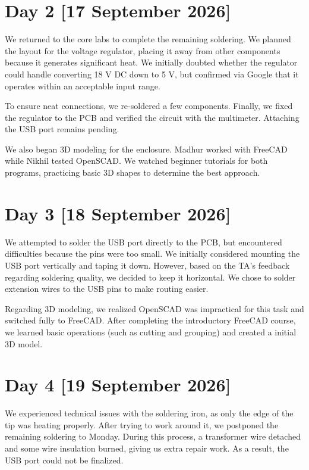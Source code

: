 \documentclass{article}
\begin{document}
\section{Day 2 [17 September 2026]}
We returned to the core labs to complete the remaining soldering. We planned the layout for the voltage regulator, placing it away from other components because it generates significant heat. We initially doubted whether the regulator could handle converting 18 V DC down to 5 V, but confirmed via Google that it operates within an acceptable input range.

To ensure neat connections, we re-soldered a few components. Finally, we fixed the regulator to the PCB and verified the circuit with the multimeter. Attaching the USB port remains pending.

We also began 3D modeling for the enclosure. Madhur worked with FreeCAD while Nikhil tested OpenSCAD. We watched beginner tutorials for both programs, practicing basic 3D shapes to determine the best approach.






\section{Day 3 [18 September 2026]}
We attempted to solder the USB port directly to the PCB, but encountered difficulties because the pins were too small. We initially considered mounting the USB port vertically and taping it down. However, based on the TA's feedback regarding soldering quality, we decided to keep it horizontal. We chose to solder extension wires to the USB pins to make routing easier.


Regarding 3D modeling, we realized OpenSCAD was impractical for this task and switched fully to FreeCAD. After completing the introductory FreeCAD course, we learned basic operations (such as cutting and grouping) and created a initial 3D model.



\section{Day 4 [19 September 2026]}
We experienced technical issues with the soldering iron, as only the edge of the tip was heating properly. After trying to work around it, we postponed the remaining soldering to Monday. During this process, a transformer wire detached and some wire insulation burned, giving us extra repair work. As a result, the USB port could not be finalized.
\end{document}
